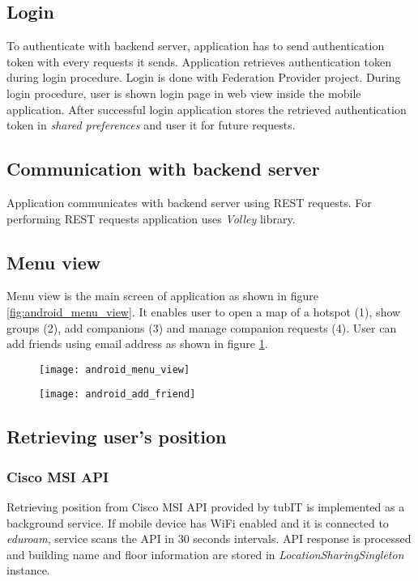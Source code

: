 \subsection{Login}
To authenticate with backend server, application has to send authentication token with every requests it sends. Application retrieves authentication token during login procedure. Login is done with Federation Provider project. During login procedure, user is shown login page in web view inside the mobile application. After successful login application stores the retrieved authentication token in \textit{shared preferences} and user it for future requests.

\subsection{Communication with backend server}
Application communicates with backend server using REST requests. For performing REST requests application uses \textit{Volley} library.

\subsection{Menu view}
Menu view is the main screen of application as shown in figure \ref{fig:android_menu_view}. It enables user to open a map of a hotspot (1), show groups (2), add companions (3) and manage companion requests (4). User can add friends using email address as shown in figure \ref{fig:android_add_friend}.

\begin{figure}
\centering
\begin{minipage}{.5\textwidth}
  \centering
  \texttt{[image: android\_menu\_view]}
  \label{fig:android_menu_view}
\end{minipage}%
\begin{minipage}{.5\textwidth}
  \centering
  \texttt{[image: android\_add\_friend]}
  \label{fig:android_add_friend}
\end{minipage}
\end{figure}

\subsection{Retrieving user's position}
\subsubsection{Cisco MSI API}
Retrieving position from Cisco MSI API provided by tubIT is implemented as a background service. If mobile device has WiFi enabled and it is connected to \textit{eduroam}, service scans the API in 30 seconds intervals. API response is processed and building name and floor information are stored in \textit{LocationSharingSingleton} instance.

